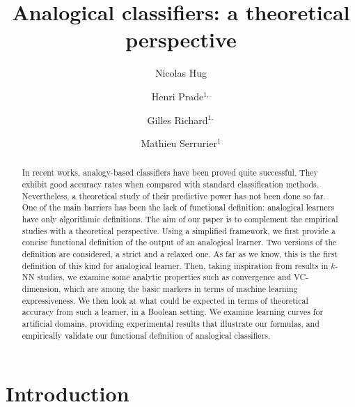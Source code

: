 \documentclass{ecai}
\begin{document}
\title{Analogical classifiers: a theoretical perspective}
\author{Nicolas Hug \and Henri
Prade$^{1,}$
\and Gilles  Richard$^{1,}$ \and Mathieu
Serrurier$^1$}

\maketitle

\begin{abstract}
In recent works, analogy-based classifiers have been proved quite successful.
They exhibit good accuracy rates when compared with standard classification
methods. Nevertheless, a theoretical study of their predictive power has not
been done so far. One of the main barriers has been the lack of functional
definition: analogical learners have only algorithmic definitions.  The aim of
our paper is to complement the empirical studies with a theoretical
perspective. Using a simplified framework, we first provide a concise
functional definition of the output of an analogical learner.  Two versions of
the definition are considered, a strict and a relaxed one.  As far as we know,
this is the first definition of this kind for analogical learner. Then, taking
inspiration from results in $k$-NN studies, we examine some analytic
properties such as convergence and VC-dimension, which are among the basic
markers in terms of machine learning expressiveness. We then look at what could
be expected in terms of theoretical accuracy from such a learner, in a Boolean
setting.  We examine learning curves for artificial domains, providing
experimental results that illustrate our formulas, and empirically validate our
functional definition of analogical classifiers.
\end{abstract}

\section{Introduction}
\end{document}
